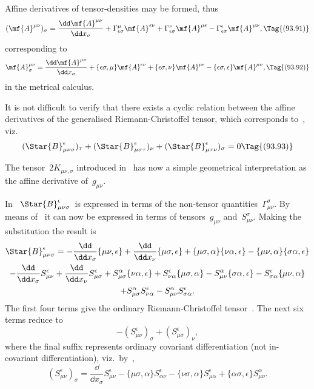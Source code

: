 \documentclass[12pt]{book}
\begin{document}
Affine derivatives of tensor\hyp{}densities may be formed, thus
\[
(\mf{A}^{\mu\nu})_\sigma = \frac{\dd\mf{A}^{\mu\nu}}{\dd x_\sigma}
                         +\Gamma^\mu_{\epsilon\sigma}\mf{A}^{\epsilon\nu}
                         +\Gamma^\nu_{\epsilon\sigma}\mf{A}^{\mu\epsilon}
                         -\Gamma^\epsilon_{\epsilon\sigma}\mf{A}^{\mu\nu},
\Tag{(93.91)}
\]
corresponding to
\[
\mf{A}^{\mu\nu}_\sigma = \frac{\dd\mf{A}^{\mu\nu}}{\dd x_\sigma}
                         +\{\epsilon\sigma,\mu\}\mf{A}^{\epsilon\nu}
                         +\{\epsilon\sigma,\nu\}\mf{A}^{\mu\epsilon}
                         -\{\epsilon\sigma,\epsilon\}\mf{A}^{\mu\nu},
\Tag{(93.92)}
\]
in the metrical calculus.

It is not difficult to verify that there exists a cyclic relation between the affine derivatives of the generalised
Riemann\hyp{}Christoffel tensor, which corresponds to~, viz.
\[
(\Star{B}^\epsilon_{\mu\nu\sigma})_\tau +
(\Star{B}^\epsilon_{\mu\sigma\tau})_\nu +
(\Star{B}^\epsilon_{\mu\tau\nu})_\sigma = 0
\Tag{(93.93)}
\]

The tensor~$2K_{\mu\nu,\sigma}$ introduced in~ has now a simple geometrical interpretation as the
affine derivative of~$g_{\mu\nu}$.



In~ $\Star{B}_{\mu\nu\sigma}^{\epsilon}$~is expressed in terms of the non\hyp{}tensor quantities~$\Gamma_{\mu\nu}^{\sigma}$.
By means of~ it can now be expressed in terms of tensors~$g_{\mu\nu}$ and~$S_{\mu\nu}^{\sigma}$.
Making the substitution the result is
\begin{multline*}
  \Star{B}_{\mu\nu\sigma}^{\epsilon}
  = -\frac{\dd}{\dd x_{\sigma}} \{\mu\nu, \epsilon\}
  + \frac{\dd}{\dd x_{\nu}} \{\mu\sigma, \epsilon\}
  + \{\mu\sigma, \alpha\} \{\nu\alpha, \epsilon\}
  - \{\mu\nu, \alpha\} \{\sigma\alpha, \epsilon\} \\
  - \frac{\dd}{\dd x_{\sigma}} S_{\mu\nu}^{\epsilon}
  + \frac{\dd}{\dd x_{\nu}} S_{\mu\sigma}^{\epsilon}
  + S_{\mu\sigma}^{\alpha} \{\nu\alpha, \epsilon\}
  + S_{\nu\alpha}^{\epsilon} \{\mu\sigma, \alpha\}
  - S_{\mu\nu}^{\alpha} \{\sigma\alpha, \epsilon\}
  - S_{\sigma\alpha}^{\epsilon} \{\mu\nu, \alpha\} \\
  + S_{\mu\sigma}^{\alpha} S_{\nu\alpha}^{\epsilon}
  - S_{\mu\nu}^{\alpha} S_{\sigma\alpha}^{\epsilon}.
\end{multline*}
The first four terms give the ordinary Riemann\hyp{}Christoffel tensor~. The
next six terms reduce to
\[
-(S_{\mu\nu}^{\epsilon})_{\sigma} + (S_{\mu\sigma}^{\epsilon})_{\nu},
\]
where the final suffix represents ordinary covariant differentiation (not in\hyp{}covariant
differentiation), viz.\ by~,
\[
(S_{\mu\nu}^{\epsilon})_{\sigma}
= \frac{\dd}{\dd x_{\sigma}} S_{\mu\nu}^{\epsilon}
- \{\mu\sigma, \alpha\} S_{\alpha\nu}^{\epsilon}
- \{\nu\sigma, \alpha\} S_{\mu\alpha}^{\epsilon}
+ \{\alpha\sigma, \epsilon\}  S_{\mu\nu}^{\alpha} .
\]
\end{document}
